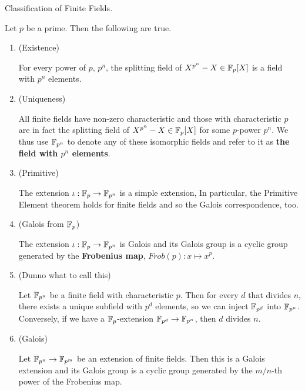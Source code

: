 \documentclass[../book.tex]{subfiles}
\begin{document}

\begin{thm} Classification of Finite Fields.
    
    Let $p$ be a prime. Then the following are true. 
    \begin{enumerate}
        \item (Existence)
        
        For every power of $p$, $p^n$, 
        the splitting field of $X^{p^n} - X \in \mathbb{F}_p[X]$
        is a field with $p^n$ elements.
        \item (Uniqueness)
        
        All finite fields have non-zero characteristic and 
        those with characteristic $p$ are in fact 
        the splitting field of $X^{p^n} - X \in \mathbb{F}_p[X]$ for some $p$-power $p^n$. 
        We thus use $\mathbb{F}_{p^n}$ to denote any of these isomorphic fields
        and refer to it as \textbf{the field with $p^n$ elements}. 
        \item (Primitive)
        
        The extension $\iota : \mathbb{F}_p \to \mathbb{F}_{p^n}$ is a simple extension,
        In particular, the Primitive Element theorem holds for finite fields
        and so the Galois correspondence, too. 
        \item (Galois from $\mathbb{F}_p$)
        
        The extension $\iota : \mathbb{F}_p \to \mathbb{F}_{p^n}$ is Galois and 
        its Galois group is a cyclic group generated by 
        the \textbf{Frobenius map}, $Frob(p) : x \mapsto x^p$. 
        \item (Dunno what to call this)
        
        Let $\mathbb{F}_{p^n}$ be a finite field with characteristic $p$. 
        Then for every $d$ that divides $n$, 
        there exists a unique subfield with $p^d$ elements,
        so we can inject $\mathbb{F}_{p^d}$ into $\mathbb{F}_{p^n}$.
        Conversely, if we have a $\mathbb{F}_p$-extension $\mathbb{F}_{p^d} \to \mathbb{F}_{p^n}$,
        then $d$ divides $n$. 
        \item (Galois)
        
        Let $\mathbb{F}_{p^n} \to \mathbb{F}_{p^m}$ be an extension of finite fields. 
        Then this is a Galois extension and 
        its Galois group is a cyclic group generated by 
        the $m/n$-th power of the Frobenius map. 
    \end{enumerate}
    
\end{thm}
\end{document}
